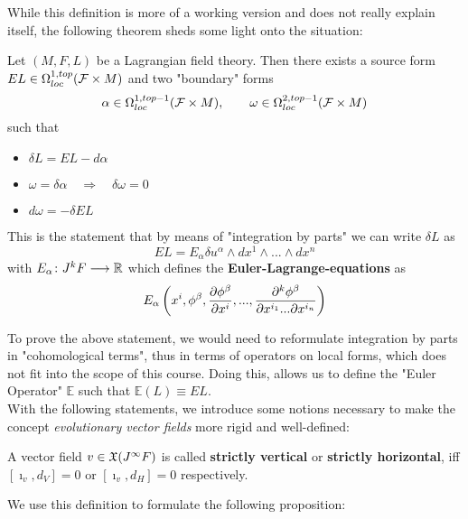While this definition is more of a working version and does not really explain itself, the following theorem sheds some light onto the situation:

\begin{theo}
  Let $(M,F,L)$ be a Lagrangian field theory. Then there exists a source form $EL \in \Omega^{1,top}_{loc}({\mathcal{F}} \times M)$ and two "boundary" forms
  $$ \alpha \in \Omega^{1,top-1}_{loc}({\mathcal{F}} \times M), \quad \quad \omega \in \Omega^{2,top-1}_{loc}({\mathcal{F}} \times M) $$
  such that
  \begin{itemize}
    \item $\delta L = EL - d \alpha$
    \item $\omega = \delta \alpha \quad \Rightarrow \quad \delta \omega = 0$
    \item $d\omega = - \delta EL$
  \end{itemize}
\end{theo}

This is the statement that by means of "integration by parts" we can write $\delta L$ as
$$EL = E_\alpha \delta u^\alpha \wedge dx^1 \wedge ... \wedge dx^n$$
with $E_\alpha\colon J^k F \longrightarrow \mathbb{R}$ which defines the \textbf{Euler-Lagrange-equations} as
$$ E_\alpha  \left(x^i, \phi^\beta, \dell{\phi^\beta}{x^i}, ..., \dell{^k \phi^\beta}{x^{i_1} ... \partial x^{i_n}}\right) $$

To prove the above statement, we would need to reformulate integration by parts in "cohomological terms", thus in terms of operators on local forms, which does not fit into the scope of this course. Doing this, allows us to define the "Euler Operator" $\mathbb{E}$ such that $\mathbb{E}(L) \equiv EL$.\\

With the following statements, we introduce some notions necessary to make the concept \emph{evolutionary vector fields} more rigid and well-defined:

\begin{definition}
\label{def:strictly}
  A vector field $v\in \mathfrak{X}(J^\infty F)$ is called \textbf{strictly vertical} or \textbf{strictly horizontal}, iff $[\imath_v, d_V] = 0$ or $[\imath_v, d_H] = 0$ respectively.
\end{definition}

We use this definition to formulate the following proposition:


